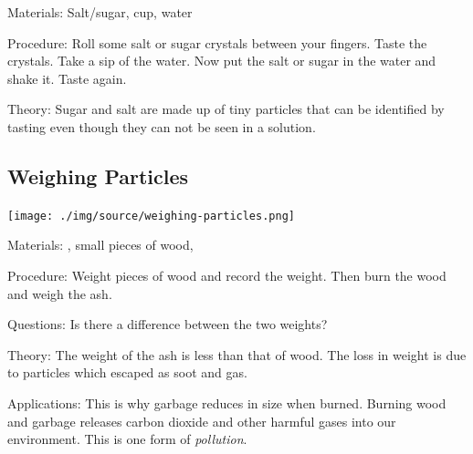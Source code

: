 \begin{multicols}{2}
\begin{description*}
\item[Materials:]{Salt/sugar, cup, water}
\item[Procedure:]{Roll some salt or sugar crystals between your fingers. Taste the crystals. Take a sip of the water. Now put the salt or sugar in the water and shake it. Taste again.}
\item[Theory:]{Sugar and salt are made up of tiny particles that can be identified by tasting even though they can not be seen in a solution.}
\end{description*}

\subsection{Weighing Particles}

\begin{center}
\texttt{[image: ./img/source/weighing-particles.png]}
\end{center}

\begin{description*}
\item[Materials:]{, small pieces of wood, }
\item[Procedure:]{Weight pieces of wood and record the weight. Then burn the wood and weigh the ash.}
\item[Questions:]{Is there a difference between the two weights?}
\item[Theory:]{The weight of the ash is less than that of wood. The loss in weight is due to particles which escaped as soot and gas.}
\item[Applications:]{This is why garbage reduces in size when burned. Burning wood and garbage releases carbon dioxide and other harmful gases into our environment. This is one form of \emph{pollution}.}
\end{description*}


\end{multicols}
